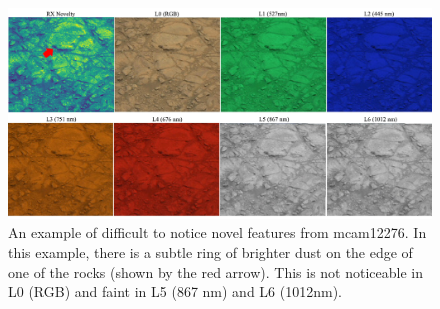 \begin{figure}
\centering
\includegraphics[width=\linewidth]{figs/msl/mcam_novel.png}
\caption[An Example of a Difficult to Spot Region in a Mastcam Multispectral Image, Clearly Visible in RX]{An example of difficult to notice novel features from mcam12276. In this example, there is a subtle ring of brighter dust on the edge of one of the rocks (shown by the red arrow). This is not noticeable in L0 (RGB) and faint in L5 (867 nm) and L6 (1012nm).}
\label{msl/fig:mcam12276}
\end{figure}

